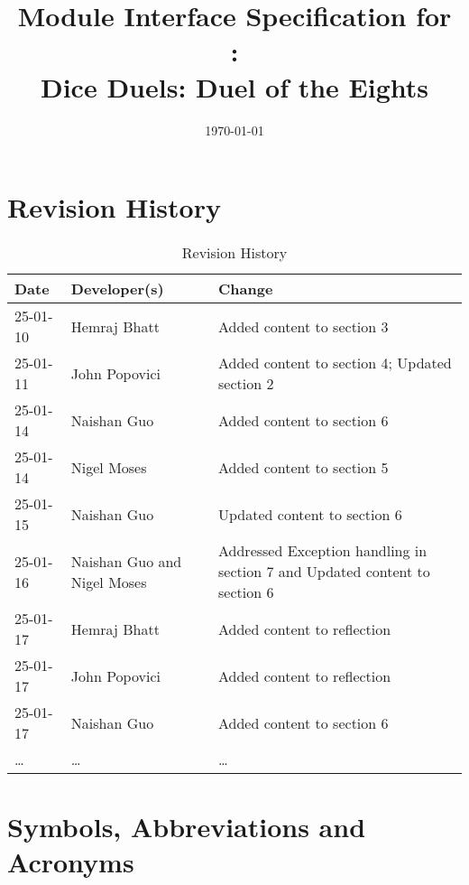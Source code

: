 \documentclass[12pt, titlepage]{article}
\begin{document}
\title{Module Interface Specification for\\\progname:\\Dice Duels: Duel of the Eights}

\author{\authname}

\date{\today}

\maketitle


\section{Revision History}

\begin{table}[hp]
\caption{Revision History} \label{TblRevisionHistory}
\begin{tabularx}{\textwidth}{llX}
\toprule
\textbf{Date} & \textbf{Developer(s)} & \textbf{Change}\\
\midrule
25-01-10 & Hemraj Bhatt & Added content to section 3\\
25-01-11 & John Popovici & Added content to section 4; Updated section 2\\
25-01-14 & Naishan Guo & Added content to section 6\\
25-01-14 & Nigel Moses & Added content to section 5\\
25-01-15 & Naishan Guo & Updated content to section 6\\
25-01-16 & Naishan Guo and Nigel Moses &  Addressed Exception handling in section 7 and Updated content to section 6 \\
25-01-17 & Hemraj Bhatt & Added content to reflection\\
25-01-17 & John Popovici & Added content to reflection\\
25-01-17 & Naishan Guo & Added content to section 6\\
\dots & \dots & \dots\\
\bottomrule
\end{tabularx}
\end{table}


\newpage

\tableofcontents

\newpage


\section{Symbols, Abbreviations and Acronyms}
\end{document}
